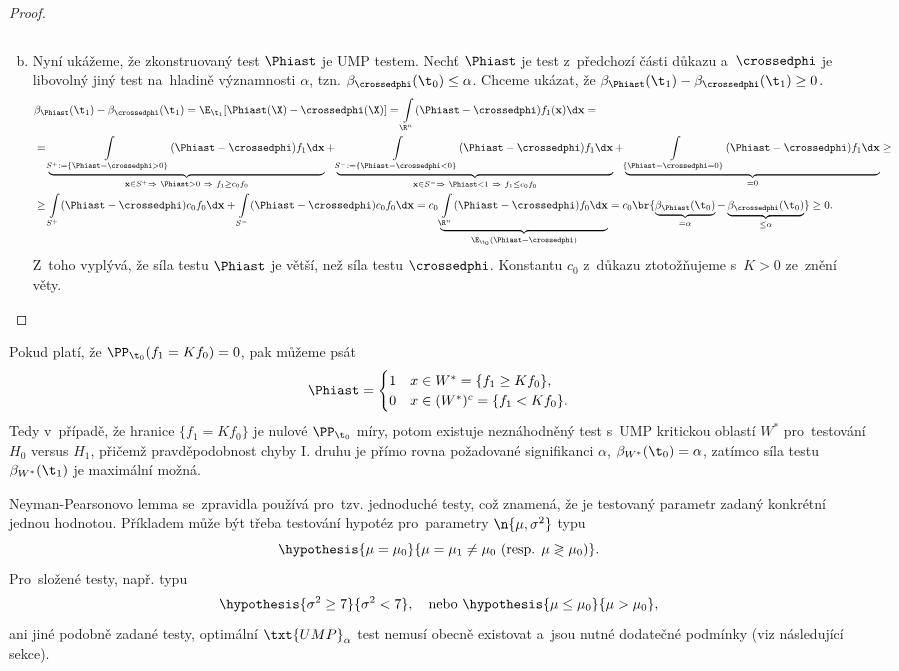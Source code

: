 \begin{theorem}
\begin{proof}
\begin{enumerate}[a)]
\[			\]
			\item Nyní ukážeme, že zkonstruovaný test $\Phiast$ je UMP testem. Nechť $\Phiast$ je test z~předchozí části důkazu a~$\crossedphi$ je libovolný jiný test na~hladině významnosti $\alpha$, tzn. $\beta_{\crossedphi}(\t_0)\leq \alpha$. Chceme ukázat, že $\beta_{\Phiast}(\t_1)-\beta_{\crossedphi}(\t_1)\geq0$.
			\[
			\begin{split}
			&\beta_{\Phiast}(\t_1)-\beta_{\crossedphi}(\t_1)=\E_{\t_1}[\Phiast(\X)-\crossedphi(\X)]=\int\limits_{\R^n}(\Phiast-\crossedphi)f_1(\textbf{x})\d\textbf{x}=\\
			&=\underbrace{\int\limits_{S^+:=\{ \Phiast-\crossedphi>0 \}}(\Phiast-\crossedphi)f_1\d\textbf{x}}_{\textbf{x}\in S^+\Rightarrow~\Phiast>0~\Rightarrow~f_1\geq c_0f_0}+\underbrace{\int\limits_{S^-:=\{ \Phiast-\crossedphi<0 \}}(\Phiast-\crossedphi)f_1\d\textbf{x}}_{\textbf{x}\in S^-\Rightarrow~\Phiast<1~\Rightarrow~ f_1\leq c_0f_0}+\underbrace{\int\limits_{\{ \Phiast-\crossedphi=0 \}}(\Phiast-\crossedphi)f_1\d\textbf{x}}_{=0}\geq\\
			&\geq
			\int\limits_{S^+}(\Phiast-\crossedphi)c_0f_0\d\textbf{x}+ \int\limits_{S^-}(\Phiast-\crossedphi)c_0f_0\d\textbf{x}=c_0\underbrace{\int\limits_{\R^n}(\Phiast-\crossedphi)f_0\d\textbf{x}}_{\E_{\t_0}(\Phiast-\crossedphi)}=c_0\br{\underbrace{\beta_{\Phiast}(\t_0)}_{=\alpha}-\underbrace{\beta_{\crossedphi}(\t_0)}_{\leq\alpha}}\geq 0. 
			\end{split}
			\] Z~toho vyplývá, že síla testu $\Phiast$ je větší, než síla testu $\crossedphi$. Konstantu $c_0$ z~důkazu ztotožňujeme s~$K>0$ ze~znění věty.
		\end{enumerate}
	\end{proof}
\end{theorem}
\begin{dusl}\label{dusledek} Pokud platí, že $\PP_{\t_0}(f_1=Kf_0)=0$, pak můžeme psát
	$$ \Phiast=\begin{cases}
	1&x\in W^\ast=\{ f_1\geq Kf_0 \},\\0& x\in (W^\ast)^c=\{f_1<Kf_0\}.
	\end{cases} $$ Tedy v~případě, že hranice $\{f_1= Kf_0\} $ je nulové $\PP_{\t_0}$ míry, potom existuje neznáhodněný test s~UMP kritickou oblastí $W^\ast$ pro~testování $H_0$ versus $H_1$, přičemž pravděpodobnost chyby I. druhu je přímo rovna požadované signifikanci $\alpha$,  $\beta_{W^\ast}(\t_0)=\alpha$, zatímco síla testu $\beta_{W^\ast}(\t_1)$ je maximální možná.
\end{dusl}
\begin{example}
	Neyman-Pearsonovo lemma se~zpravidla používá pro~tzv. jednoduché testy, což znamená, že je testovaný parametr zadaný konkrétní jednou hodnotou. Příkladem může být třeba testování hypotéz pro~parametry $\n{\mu,\sigma^2}$ typu 
$$ \hypothesis{\mu=\mu_0}{\mu=\mu_1\neq\mu_0~(\text{resp. }\mu\gtrless\mu_0)}. $$
 Pro~složené testy, např. typu
$$ \hypothesis{\sigma^2\geq7}{\sigma^2< 7},\quad\text{nebo }\hypothesis{\mu\leq\mu_0}{\mu>\mu_0},  $$ ani jiné podobně zadané testy, optimální $\txt{UMP}_\alpha$ test nemusí obecně existovat a~jsou nutné dodatečné podmínky (viz následující sekce).
\end{example}

